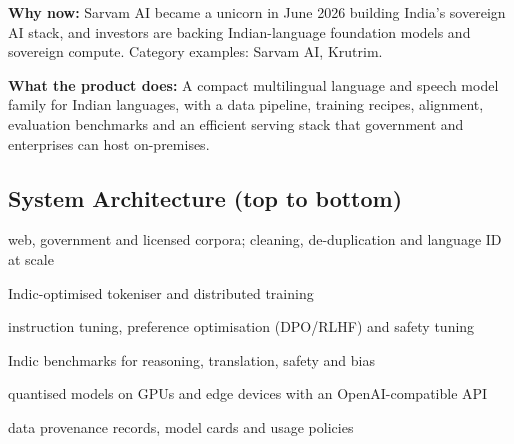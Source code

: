 \documentclass[10pt,a4paper]{article}
\begin{document}
\begin{tcolorbox}[colback=l1bg,colframe=l1bg,arc=2pt,borderline west={3pt}{0pt}{saffron},top=2pt,bottom=2pt]\small\textbf{Why now:} Sarvam AI became a unicorn in June 2026 building India's sovereign AI stack, and investors are backing Indian-language foundation models and sovereign compute. {\color{muted}Category examples: Sarvam AI, Krutrim.}\end{tcolorbox}
\begin{tcolorbox}[colback=l3bg,colframe=l3bg,arc=2pt,borderline west={3pt}{0pt}{igreen},top=2pt,bottom=2pt]\small\textbf{What the product does:} A compact multilingual language and speech model family for Indian languages, with a data pipeline, training recipes, alignment, evaluation benchmarks and an efficient serving stack that government and enterprises can host on-premises.\end{tcolorbox}
\subsection*{System Architecture (top to bottom)}
\begin{tcolorbox}[colback=lay0,colframe=lay0,arc=2pt,top=1.5pt,bottom=1.5pt,left=6pt,before skip=2pt,after skip=2pt]\small{} web, government and licensed corpora; cleaning, de-duplication and language ID at scale\end{tcolorbox}
\begin{tcolorbox}[colback=lay1,colframe=lay1,arc=2pt,top=1.5pt,bottom=1.5pt,left=6pt,before skip=2pt,after skip=2pt]\small{} Indic-optimised tokeniser and distributed training\end{tcolorbox}
\begin{tcolorbox}[colback=lay2,colframe=lay2,arc=2pt,top=1.5pt,bottom=1.5pt,left=6pt,before skip=2pt,after skip=2pt]\small{} instruction tuning, preference optimisation (DPO/RLHF) and safety tuning\end{tcolorbox}
\begin{tcolorbox}[colback=lay3,colframe=lay3,arc=2pt,top=1.5pt,bottom=1.5pt,left=6pt,before skip=2pt,after skip=2pt]\small{} Indic benchmarks for reasoning, translation, safety and bias\end{tcolorbox}
\begin{tcolorbox}[colback=lay4,colframe=lay4,arc=2pt,top=1.5pt,bottom=1.5pt,left=6pt,before skip=2pt,after skip=2pt]\small{} quantised models on GPUs and edge devices with an OpenAI-compatible API\end{tcolorbox}
\begin{tcolorbox}[colback=lay5,colframe=lay5,arc=2pt,top=1.5pt,bottom=1.5pt,left=6pt,before skip=2pt,after skip=2pt]\small{} data provenance records, model cards and usage policies\end{tcolorbox}
\end{document}
